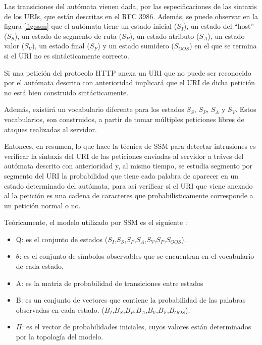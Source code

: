 Las transiciones del autómata vienen dada, por las especificaciones de las sintaxis de los URIs, que est\'an descritas en el RFC 3986. Adem\'as, se puede observar en la figura \ref{fig:ssm} que el autómata tiene un estado inicial ($S_{I}$), un estado del ``host'' ($S_{S}$), un estado de segmento de ruta ($S_{P}$), un estado atributo ($S_{A}$), un estado valor ($S_{V}$), un estado final ($S_{F}$) y un estado sumidero ($S_{OOS}$) en el que se termina si el URI no es sint\'acticamente correcto.

Si una petici\'on del protocolo HTTP anexa un URI que no puede ser reconocido por el autómata descrito con anterioridad implicar\'a que el URI de dicha petici\'on no est\'a bien construido sintácticamente.

Adem\'as, existirá un vocabulario diferente para los estados $S_{S}$, $S_{P}$, $S_{A}$ y $S_{V}$. Estos vocabularios, son construidos, a partir de tomar m\'ultiples peticiones libres de ataques realizadas al servidor. 

Entonces, en resumen, lo que hace la t\'ecnica de SSM para detectar intrusiones es verificar la sintaxis del URI de las peticiones enviadas al servidor a tráves del autómata descrito con anterioridad y, al mismo tiempo, se estudia segmento por segmento del URI la probabilidad que tiene cada palabra de aparecer en un estado determinado del autómata, para as\'i verificar si el URI que viene anexado al la petici\'on es una cadena de caracteres que probabilísticamente corresponde a un petici\'on normal o no.

Teóricamente, el modelo utilizado por SSM es el siguiente \cite{tesisMexico}:

\begin{itemize}
\item Q: es el conjunto de estados ($S_{I}$,$S_{S}$,$S_{P}$,$S_{A}$,$S_{V}$,$S_{F}$,$S_{OOS}$).
\item $\theta$: es el conjunto de s\'imbolos observables que se encuentran en el vocabulario de cada estado.
\item A: es la matriz de probabilidad de transiciones entre estados
\item B: es un conjunto de vectores que contiene la probabilidad de las palabras observadas en cada estado. ($B_{I}$,$B_{S}$,$B_{P}$,$B_{A}$,$B_{V}$,$B_{F}$,$B_{OOS}$).
\item $\Pi$: es el vector de probabilidades iniciales, cuyos valores est\'an determinados por la topolog\'ia del modelo. 
\end{itemize}

